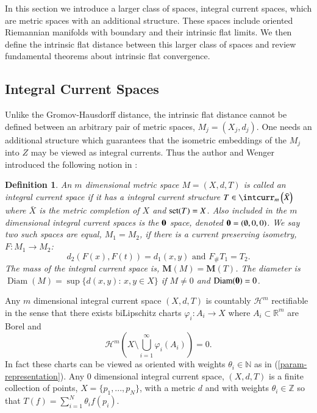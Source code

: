 \documentclass[12pt]{amsart}
\newtheorem{defn}[thm]{Definition}
\begin{document}
In this section we introduce a larger class of spaces, integral current spaces,
which are metric spaces
with an additional structure.   These spaces include oriented Riemannian
manifolds with boundary and their intrinsic flat limits.   We then define the intrinsic flat distance between this larger class of spaces and review fundamental theorems
about intrinsic flat convergence.   

\subsection{Integral Current Spaces}\label{subsect-int-cur-space}

Unlike the Gromov-Hausdorff distance, the intrinsic flat distance 
cannot be defined between an arbitrary pair of metric spaces, $M_j=(X_j,d_j)$.
One needs an additional structure which guarantees that the isometric
embeddings of the $M_j$ into $Z$ may be viewed as integral currents.
Thus the author and Wenger introduced the following notion
in \cite{SorWen2}:

\begin{defn} \label{defn-int-curr-space}
An $m$ dimensional metric space 
$M=\left(X,d,T\right)$ is called an integral current space if
it has a integral current structure $T \in \intcurr_m\left(\bar{X}\right)$
where $\bar{X}$ is the metric completion of $X$
and ${{\rm{set}}}(T)=X$.   Also included in the $m$ dimensional integral
current spaces is the ${\bf 0}$ space, denoted ${\bf{0}}=(\emptyset,0,0)$.
We say two such spaces are equal, $M_1=M_2$, if there is a
current preserving isometry, $F: M_1 \to M_2$:
\begin{equation} \label{current-preserving-isometry}
d_2(F(x), F(t))=d_1(x,y) \textrm{ and } F_\# T_1= T_2.
\end{equation}
The mass of the integral current space is, ${{\mathbf M}}(M)={{\mathbf M}}(T)$.
The diameter is ${\operatorname{Diam}}(M)=\sup\{d(x,y):\, x,y\in X\}$ if $M\neq 0$
and ${\operatorname{Diam}}({\bf{0}})=0$. 
\end{defn}

Any $m$ dimensional integral current space $(X,d,T)$ is countably 
$\mathcal{H}^m$ rectifiable in the sense that there
exists biLipschitz charts $\varphi_i: A_i \to X$ 
where $A_i\subset {\mathbb{R}}^m$ are Borel
and
\begin{equation} \label{lim-rect}
\mathcal{H}^m\left(X\setminus \bigcup_{i=1}^\infty \varphi_i(A_i) \right)=0.
\end{equation}
In fact these charts can be viewed as oriented with
weights $\theta_i\in {\mathbb{N}}$ 
as in (\ref{param-representation}). Any $0$ dimensional integral current space,
$(X,d,T)$ is a finite collection of points, $X=\{p_1,...,p_N\}$,
with a metric $d$ and with 
weights $\theta_i \in \mathbb{Z}$ so that
$T(f)= \sum_{i=1}^N \theta_i f(p_i)$.  
  
\end{document}
